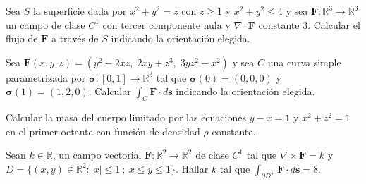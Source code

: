 
\begin{question}
    Sea  $S$  la superficie dada por $x^{2}+ y^{2} = z$ con $z \geq 1$  y $x^{2}+ y^{2} \leq 4$  y sea  $\mathbf{F}:\mathbb{R}^{3}\rightarrow\mathbb{R}^{3}$  un campo de clase $C^{1}$ con tercer componente  nula y $\nabla \cdot \mathbf{F}$ constante 3. Calcular el flujo de  $\mathbf{F}$  a trav\'es de $S$ indicando la orientaci\'on elegida.
\end{question}


\begin{question}
    Sea $\mathbf{F}(x,y,z) = (y^{2}-2xz,\;2xy+z^{3},\;3yz^{2}-x^{2}) $ y sea  $C$ una curva simple parametrizada por $\boldsymbol{\sigma}:[0,1]\rightarrow \mathbb{R}^{3}$
    tal que $\boldsymbol{\sigma}(0)=(0,0,0)$ y $\boldsymbol{\sigma}(1)=(1,2,0)$. Calcular $\int_{C} \mathbf{F}\cdot d\mathbf{s}$ indicando la orientaci\'on elegida.
\end{question}


\begin{question}
    Calcular la masa del cuerpo limitado por las ecuaciones $y-x=1$ y $x^{2}+ z^{2} = 1$ en el primer octante con funci\'on de densidad $\rho$ constante.
\end{question}


\begin{question}
    Sean  $k\in\mathbb{R}$,  un campo vectorial $\mathbf{F}:\mathbb{R}^{2}\rightarrow\mathbb{R}^{2}$   de clase $C^{1}$ tal que $\nabla\times \mathbf{F}=k$ y $D=\{ (x,y) \in \mathbb{R}^{2} :  |x| \leq 1 \:  ; \:   x \leq y\leq 1  \}.$ Hallar $k$ tal que $\int_{\partial D^{+}}\mathbf{F}\cdot d\mathbf{s} = 8$.
\end{question}

